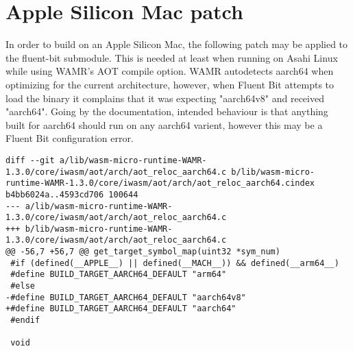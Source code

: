 \section{Apple Silicon Mac patch}
In order to build on an Apple Silicon Mac, the following patch may be applied to the fluent-bit submodule. This is needed at least when running on Asahi Linux while using WAMR's AOT compile option. WAMR autodetects aarch64 when optimizing for the current architecture, however, when Fluent Bit attempts to load the binary it complains that it was expecting "aarch64v8" and received "aarch64". Going by the documentation, intended behaviour is that anything built for aarch64 should run on any aarch64 varient, however this may be a Fluent Bit configuration error.
\begin{verbatim}
diff --git a/lib/wasm-micro-runtime-WAMR-1.3.0/core/iwasm/aot/arch/aot_reloc_aarch64.c b/lib/wasm-micro-runtime-WAMR-1.3.0/core/iwasm/aot/arch/aot_reloc_aarch64.cindex b4bb6024a..4593cd706 100644
--- a/lib/wasm-micro-runtime-WAMR-1.3.0/core/iwasm/aot/arch/aot_reloc_aarch64.c
+++ b/lib/wasm-micro-runtime-WAMR-1.3.0/core/iwasm/aot/arch/aot_reloc_aarch64.c
@@ -56,7 +56,7 @@ get_target_symbol_map(uint32 *sym_num)
 #if (defined(__APPLE__) || defined(__MACH__)) && defined(__arm64__)
 #define BUILD_TARGET_AARCH64_DEFAULT "arm64"
 #else
-#define BUILD_TARGET_AARCH64_DEFAULT "aarch64v8"
+#define BUILD_TARGET_AARCH64_DEFAULT "aarch64"
 #endif
 
 void
\end{verbatim}
